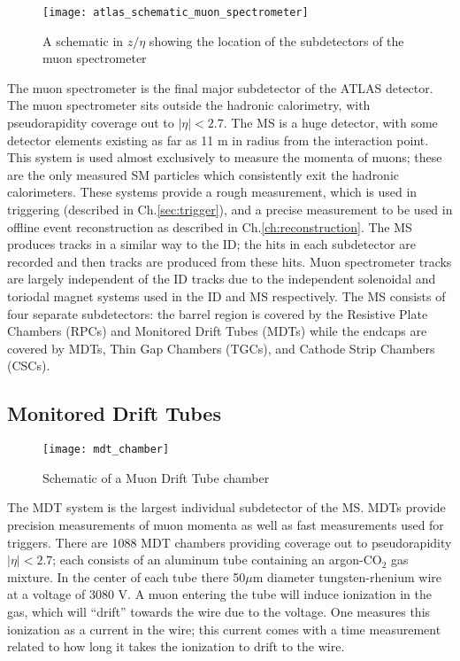 \begin{figure}
\caption{A schematic in $z/\eta$ showing the location of the subdetectors of the muon spectrometer} \label{fig:atlas_schematic_muon_spectrometer}
\texttt{[image: atlas\_schematic\_muon\_spectrometer]}
\end{figure}

The muon spectrometer is the final major subdetector of the ATLAS detector.
The muon spectrometer sits outside the hadronic calorimetry, with pseudorapidity coverage out to $|\eta| < 2.7$.
The MS is a huge detector, with some detector elements existing as far as 11 m in radius from the interaction point.
This system is used almost exclusively to measure the momenta of muons; these are the only measured SM particles which consistently exit the hadronic calorimeters.
These systems provide a rough measurement, which is used in triggering (described in Ch.\ref{sec:trigger}), and a precise measurement to be used in offline event reconstruction as described in Ch.\ref{ch:reconstruction}.
The MS produces tracks in a similar way to the ID; the hits in each subdetector are recorded and then tracks are produced from these hits.
Muon spectrometer tracks are largely independent of the ID tracks due to the independent solenoidal and toriodal magnet systems used in the ID and MS respectively.
The MS consists of four separate subdetectors: the barrel region is covered by the Resistive Plate Chambers (RPCs) and Monitored Drift Tubes (MDTs) while the endcaps are covered by MDTs, Thin Gap Chambers (TGCs), and Cathode Strip Chambers (CSCs).

\subsection{Monitored Drift Tubes}
\begin{figure}
\caption{Schematic of a Muon Drift Tube chamber} \label{fig:mdt_chamber}
\texttt{[image: mdt\_chamber]}
\end{figure}

The MDT system is the largest individual subdetector of the MS.
MDTs provide precision measurements of muon momenta as well as fast measurements used for triggers.
There are 1088 MDT chambers providing coverage out to pseudorapidity $|\eta| < 2.7 $; each consists of an aluminum tube containing an argon-CO$_2$ gas mixture.
In the center of each tube there 50$\mu$m diameter tungsten-rhenium wire at a voltage of 3080 V.
A muon entering the tube will induce ionization in the gas, which will ``drift'' towards the wire due to the voltage.
One measures this ionization as a current in the wire; this current comes with a time measurement related to how long it takes the ionization to drift to the wire.

